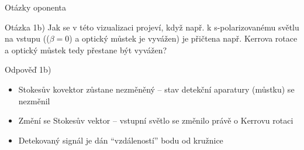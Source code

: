 \begin{frame}{Otázky oponenta}
    \begin{block}{Otázka 1b)}
        Jak se v této vizualizaci projeví, když např. k s-polarizovanému světlu na vstupu (($\beta=0$) a optický můstek je vyvážen) je přičtena např. Kerrova rotace a optický můstek tedy přestane být vyvážen?
    \end{block}
    \begin{exampleblock}{Odpověď 1b)}
        \begin{itemize}
            \item Stokesův kovektor zůstane nezměněný -- stav detekční aparatury (můstku) se nezměnil
            \item Změní se Stokesův vektor -- vstupní světlo se změnilo právě o Kerrovu rotaci
            \item Detekovaný signál je dán ``vzdáleností'' bodu od kružnice
        \end{itemize}
    \end{exampleblock}
\end{frame}

